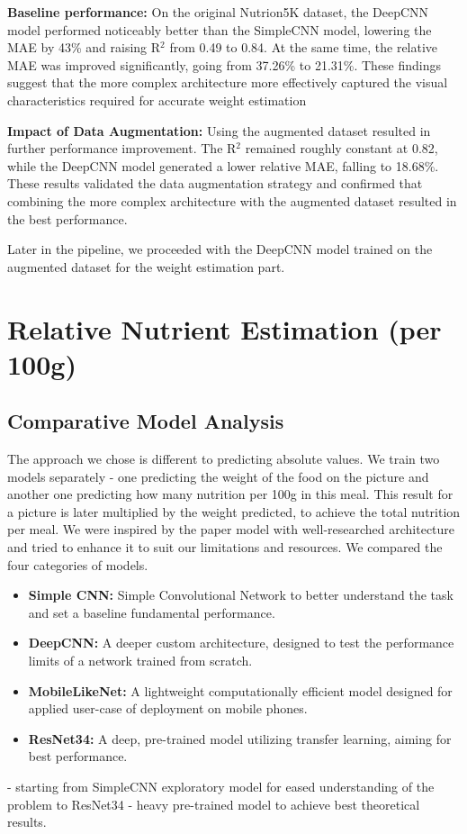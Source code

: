 \documentclass[a4paper]{article}
\begin{document}
        \textbf{Baseline performance:} On the original Nutrion5K dataset, the DeepCNN model performed noticeably better than the SimpleCNN model, lowering the MAE by 43\% and raising R$^2$ from 0.49 to 0.84. At the same time, the relative MAE was improved significantly, going from 37.26\% to 21.31\%. These findings suggest that the more complex architecture more effectively captured the visual characteristics required for accurate weight estimation

       \textbf{ Impact of Data Augmentation:} Using the augmented dataset resulted in further performance improvement.  The R$^2$ remained roughly constant at 0.82, while the DeepCNN model generated a lower relative MAE, falling to 18.68\%. These results validated the data augmentation strategy and confirmed that combining the more complex architecture with the augmented dataset resulted in the best performance.

       Later in the pipeline, we proceeded with the DeepCNN model trained on the augmented dataset for the weight estimation part. 


        
        \section{Relative Nutrient Estimation (per 100g)}
        \subsection{Comparative Model Analysis}
        The approach we chose is different to predicting absolute values. We train two models separately - one predicting the weight of the food on the picture and another one predicting how many nutrition per 100g in this meal. This result for a picture is later multiplied by the weight predicted, to achieve the total nutrition per meal. We were inspired by the paper model with well-researched architecture and tried to enhance it to suit our limitations and resources. We compared the four categories of models.
        \begin{itemize}
        \item \textbf{Simple CNN:} Simple Convolutional Network to better understand the task and set a baseline fundamental performance.
        \item \textbf{DeepCNN:} A deeper custom architecture, designed to test the performance limits of a network trained from scratch.
        \item \textbf{MobileLikeNet:} A lightweight computationally efficient model designed for applied user-case of deployment on mobile phones.
        \item \textbf{ResNet34:} A deep, pre-trained model utilizing transfer learning, aiming for best performance.
    \end{itemize}
        - starting from SimpleCNN exploratory model for eased understanding of the problem to ResNet34 - heavy pre-trained model to achieve best theoretical results. 
        
\end{document}
